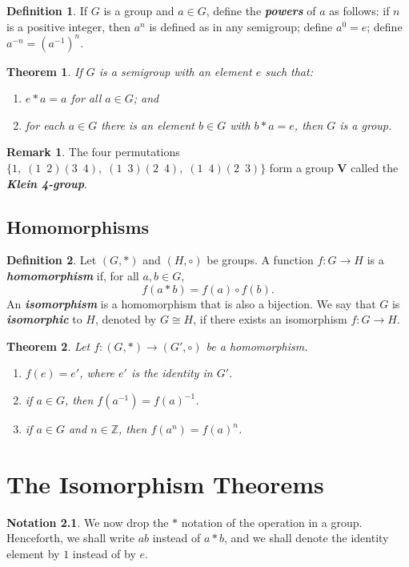 \documentclass[10pt]{report}
\newtheorem{theorem}{Theorem}[chapter]
\theoremstyle{definition}
\newtheorem*{definition}{Definition}
\newtheorem*{notation}{Notation}
\newtheorem*{remark}{Remark}
\newcommand{\term}[1]{\textbf{\textit{#1}}}
\begin{document}
\begin{definition}
	If $G$ is a group and $a\in G$, define the \term{powers} of $a$ as follows: if $n$ is a positive integer, then $a^n$ is defined as in any semigroup; define $a^0=e$; define $a^{-n}=(a^{-1})^n$.
\end{definition}

\begin{theorem}
	If $G$ is a semigroup with an element $e$ such that:
	\begin{enumerate}
		\item $e\ast a=a$ for all $a\in G$; and
		\item for each $a\in G$ there is an element $b\in G$ with $b\ast a=e$, then $G$ is a group.
	\end{enumerate}
\end{theorem}

\begin{remark}
	The four permutations $\{1,\;(1\enspace2)(3\enspace4),\;(1\enspace3)(2\enspace4),\;(1\enspace4)(2\enspace3) \}$
	form a group $\mathbf{V}$ called the \term{Klein 4-group}.
\end{remark}

\section{Homomorphisms}
\begin{definition}
	Let $(G,\ast)$ and $(H,\circ)$ be groups. A function $f:G\to H$ is a \term{homomorphism} if, for all $a,b\in G$, \[f(a\ast b)=f(a)\circ f(b).\]
	An \term{isomorphism} is a homomorphism that is also a bijection. We say that $G$ is \term{isomorphic} to $H$, denoted by $G\cong H$, if there exists an isomorphism $f:G\to H$.
\end{definition}

\begin{theorem}
	Let $f:(G,\ast)\to(G',\circ)$ be a homomorphism.
	\begin{enumerate}
		\item $f(e)=e'$, where $e'$ is the identity in $G'$.
		\item if $a\in G$, then $f(a^{-1})=f(a)^{-1}$.
		\item if $a\in G$ and $n\in\mathbb{Z}$, then $f(a^n)=f(a)^n$.
	\end{enumerate}
\end{theorem}



\chapter{The Isomorphism Theorems}
\begin{notation}
	We now drop the $\ast$ notation of the operation in a group. Henceforth, we shall write $ab$ instead of $a\ast b$, and we shall denote the identity element by $1$ instead of by $e$.
\end{notation}
\end{document}
